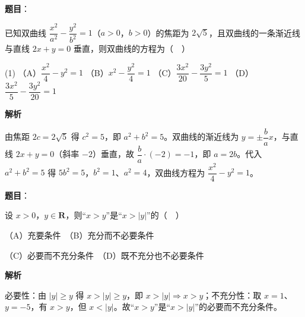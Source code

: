 \begin{answer}

\textbf{题目}：

已知双曲线 \(\dfrac{x^{2}}{a^{2}}-\dfrac{y^{2}}{b^{2}}=1\)（\(a>0\)，\(b>0\)）的焦距为 \(2\sqrt{5}\)，且双曲线的一条渐近线与直线 \(2x+y=0\) 垂直，则双曲线的方程为（　）

\begin{gkopts}(1)
\task （A）\(\dfrac{x^{2}}{4}-y^{2}=1\)
\task （B）\(x^{2}-\dfrac{y^{2}}{4}=1\)
\task （C）\(\dfrac{3x^{2}}{20}-\dfrac{3y^{2}}{5}=1\)
\task （D）\(\dfrac{3x^{2}}{5}-\dfrac{3y^{2}}{20}=1\)
\end{gkopts}

\textbf{解析}

由焦距 \(2c=2\sqrt{5}\) 得 \(c^{2}=5\)，即 \(a^{2}+b^{2}=5\)。双曲线的渐近线为 \(y=\pm\dfrac{b}{a}x\)，与直线 \(2x+y=0\)（斜率 \(-2\)）垂直，故 \(\dfrac{b}{a}\cdot(-2)=-1\)，即 \(a=2b\)。代入 \(a^{2}+b^{2}=5\) 得 \(5b^{2}=5\)，\(b^{2}=1\)、\(a^{2}=4\)，双曲线方程为 \(\dfrac{x^{2}}{4}-y^{2}=1\)。


\end{answer}
\begin{answer}

\textbf{题目}：

设 \(x>0\)，\(y\in\mathbf{R}\)，则“\(x>y\)”是“\(x>|y|\)”的（　）

（A）充要条件　（B）充分而不必要条件

（C）必要而不充分条件　（D）既不充分也不必要条件

\textbf{解析}

必要性：由 \(|y|\geqslant y\) 得 \(x>|y|\geqslant y\)，即 \(x>|y|\Rightarrow x>y\)；不充分性：取 \(x=1\)、\(y=-5\)，有 \(x>y\)，但 \(x<|y|\)。故“\(x>y\)”是“\(x>|y|\)”的必要而不充分条件。


\end{answer}

